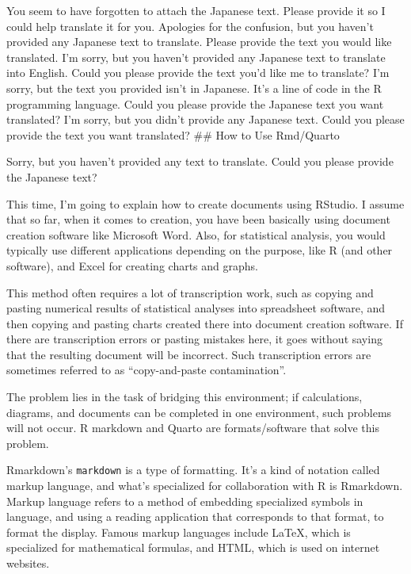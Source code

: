\documentclass[
  a4paper,
]{book}
\begin{document}
You seem to have forgotten to attach the Japanese text. Please provide
it so I could help translate it for you. Apologies for the confusion,
but you haven't provided any Japanese text to translate. Please provide
the text you would like translated. I'm sorry, but you haven't provided
any Japanese text to translate into English. Could you please provide
the text you'd like me to translate? I'm sorry, but the text you
provided isn't in Japanese. It's a line of code in the R programming
language. Could you please provide the Japanese text you want
translated? I'm sorry, but you didn't provide any Japanese text. Could
you please provide the text you want translated? \#\# How to Use
Rmd/Quarto

Sorry, but you haven't provided any text to translate. Could you please
provide the Japanese text?

This time, I'm going to explain how to create documents using RStudio. I
assume that so far, when it comes to creation, you have been basically
using document creation software like Microsoft Word. Also, for
statistical analysis, you would typically use different applications
depending on the purpose, like R (and other software), and Excel for
creating charts and graphs.

This method often requires a lot of transcription work, such as copying
and pasting numerical results of statistical analyses into spreadsheet
software, and then copying and pasting charts created there into
document creation software. If there are transcription errors or pasting
mistakes here, it goes without saying that the resulting document will
be incorrect. Such transcription errors are sometimes referred to as
``copy-and-paste contamination''.

The problem lies in the task of bridging this environment; if
calculations, diagrams, and documents can be completed in one
environment, such problems will not occur. R markdown and Quarto are
formats/software that solve this problem.

Rmarkdown's \texttt{markdown} is a type of formatting. It's a kind of
notation called markup language, and what's specialized for
collaboration with R is Rmarkdown. Markup language refers to a method of
embedding specialized symbols in language, and using a reading
application that corresponds to that format, to format the display.
Famous markup languages include LaTeX, which is specialized for
mathematical formulas, and HTML, which is used on internet websites.
\end{document}
